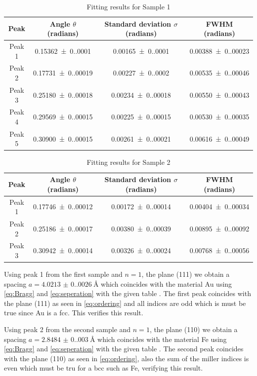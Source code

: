 \begin{table}[H]
    \centering
    \caption{Fitting results for Sample 1}
    \begin{tabular}{|c|c|c|c|}
    \hline
    Peak & Angle $\theta$ (radians) & Standard deviation $\sigma$ (radians) & FWHM (radians) \\
    \hline
    Peak 1 & \SI{0.15362(0.00010)}{} & \SI{0.00165(0.00010)}{} & \SI{0.00388(0.00023)}{} \\
    \hline
    Peak 2 & \SI{0.17731(0.00019)}{} & \SI{0.00227(0.00020)}{} & \SI{0.00535(0.00046)}{} \\
    \hline
    Peak 3 & \SI{0.25180(0.00018)}{} & \SI{0.00234(0.00018)}{} & \SI{0.00550(0.00043)}{} \\
    \hline
    Peak 4 & \SI{0.29569(0.00015)}{} & \SI{0.00225(0.00015)}{} & \SI{0.00530(0.00035)}{} \\
    \hline
    Peak 5 & \SI{0.30900(0.00015)}{} & \SI{0.00261(0.00021)}{} & \SI{0.00616(0.00049)}{} \\
    \hline
    \end{tabular}
\end{table}

\begin{table}[H]
    \centering
    \caption{Fitting results for Sample 2}
    \begin{tabular}{|c|c|c|c|}
    \hline
    Peak & Angle $\theta$ (radians) & Standard deviation $\sigma$ (radians) & FWHM (radians) \\
    \hline
    Peak 1 & \SI{0.17746(0.00012)}{} & \SI{0.00172(0.00014)}{} & \SI{0.00404(0.00034)}{} \\
    \hline
    Peak 2 & \SI{0.25186(0.00017)}{} & \SI{0.00380(0.00039)}{} & \SI{0.00895(0.00092)}{} \\
    \hline
    Peak 3 & \SI{0.30942(0.00014)}{} & \SI{0.00326(0.00024)}{} & \SI{0.00768(0.00056)}{} \\
    \hline
    \end{tabular}
\end{table}


Using peak 1 from the first sample and $n=1$, the plane (111) we obtain a spacing $a=\SI{4.0213(0.0026)}{\angstrom}$ which coincides with the material Au using \autoref{eq:Bragg} and \autoref{eq:seperation} with the given table \cite{solidstatephysics2025}. The first peak coincides with the plane (111) as seen in \autoref{eq:ordering} and all indices are odd which is must be true since Au is a fcc. This verifies this result. 

Using peak 2 from the second sample and $n=1$, the plane (110) we obtain a spacing $a=\SI{2.8484(0.0030)}{\angstrom}$ which coincides with the material Fe using \autoref{eq:Bragg} and \autoref{eq:seperation} with the given table \cite{solidstatephysics2025}. The second peak coincides with the plane (110) as seen in \autoref{eq:ordering}, also the sum of the miller indices is even which must be tru for a bcc such as Fe, verifying this result. 



